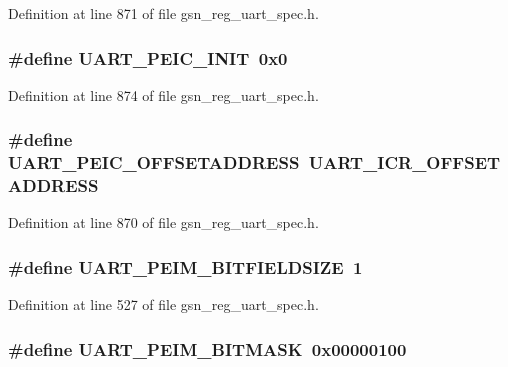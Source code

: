 Definition at line 871 of file gsn\_\-reg\_\-uart\_\-spec.h.

\hypertarget{a00575_a59f4771ece7172bf1823eb697b79f6b0}{
\subsubsection[{UART\_\-PEIC\_\-INIT}]{\setlength{\rightskip}{0pt plus 5cm}\#define UART\_\-PEIC\_\-INIT~0x0}}
\label{a00575_a59f4771ece7172bf1823eb697b79f6b0}


Definition at line 874 of file gsn\_\-reg\_\-uart\_\-spec.h.

\hypertarget{a00575_a3c262023bb3338c6c818b4beff626291}{
\subsubsection[{UART\_\-PEIC\_\-OFFSETADDRESS}]{\setlength{\rightskip}{0pt plus 5cm}\#define UART\_\-PEIC\_\-OFFSETADDRESS~UART\_\-ICR\_\-OFFSETADDRESS}}
\label{a00575_a3c262023bb3338c6c818b4beff626291}


Definition at line 870 of file gsn\_\-reg\_\-uart\_\-spec.h.

\hypertarget{a00575_a05e450b0c50af4185d372d75fb40b82b}{
\subsubsection[{UART\_\-PEIM\_\-BITFIELDSIZE}]{\setlength{\rightskip}{0pt plus 5cm}\#define UART\_\-PEIM\_\-BITFIELDSIZE~1}}
\label{a00575_a05e450b0c50af4185d372d75fb40b82b}


Definition at line 527 of file gsn\_\-reg\_\-uart\_\-spec.h.

\hypertarget{a00575_a1ff7f619049fb658091eede9f254e581}{
\subsubsection[{UART\_\-PEIM\_\-BITMASK}]{\setlength{\rightskip}{0pt plus 5cm}\#define UART\_\-PEIM\_\-BITMASK~0x00000100}}
\label{a00575_a1ff7f619049fb658091eede9f254e581}


